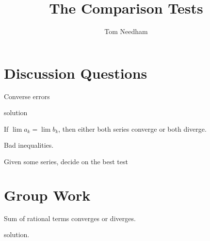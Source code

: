 \documentclass[]{ximera}
\author{Tom Needham}
\title[]{The Comparison Tests}
\begin{document}
\begin{abstract}
\end{abstract}
\maketitle

\vspace{-0.9in}

\section{Discussion Questions}

\begin{problem}
Converse errors
\end{problem}

\begin{freeResponse}
solution
\end{freeResponse}

\begin{problem}
If $\lim a_k = \lim b_k$, then either both series converge or both diverge.
\end{problem}

\begin{problem}
Bad inequalities.
\end{problem}

\begin{problem}
Given some series, decide on the best test
\end{problem}

\section{Group Work}

\begin{problem}
Sum of rational terms converges or diverges.
\end{problem}

\begin{freeResponse}
solution.
\end{freeResponse}
\end{document}
